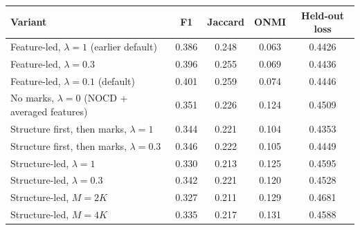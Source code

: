 \begin{tabular}{lcccc}
\toprule
Variant & F1 & Jaccard & ONMI & Held-out loss \\
\midrule
Feature-led, $\lambda = 1$ (earlier default) & 0.386 & 0.248 & 0.063 & 0.4426 \\
Feature-led, $\lambda = 0.3$ & 0.396 & 0.255 & 0.069 & 0.4436 \\
Feature-led, $\lambda = 0.1$ (default) & 0.401 & 0.259 & 0.074 & 0.4446 \\
No marks, $\lambda = 0$ (NOCD + averaged features) & 0.351 & 0.226 & 0.124 & 0.4509 \\
Structure first, then marks, $\lambda = 1$ & 0.344 & 0.221 & 0.104 & 0.4353 \\
Structure first, then marks, $\lambda = 0.3$ & 0.346 & 0.222 & 0.105 & 0.4449 \\
Structure-led, $\lambda = 1$ & 0.330 & 0.213 & 0.125 & 0.4595 \\
Structure-led, $\lambda = 0.3$ & 0.342 & 0.221 & 0.120 & 0.4528 \\
Structure-led, $M = 2K$ & 0.327 & 0.211 & 0.129 & 0.4681 \\
Structure-led, $M = 4K$ & 0.335 & 0.217 & 0.131 & 0.4588 \\
\bottomrule
\end{tabular}
